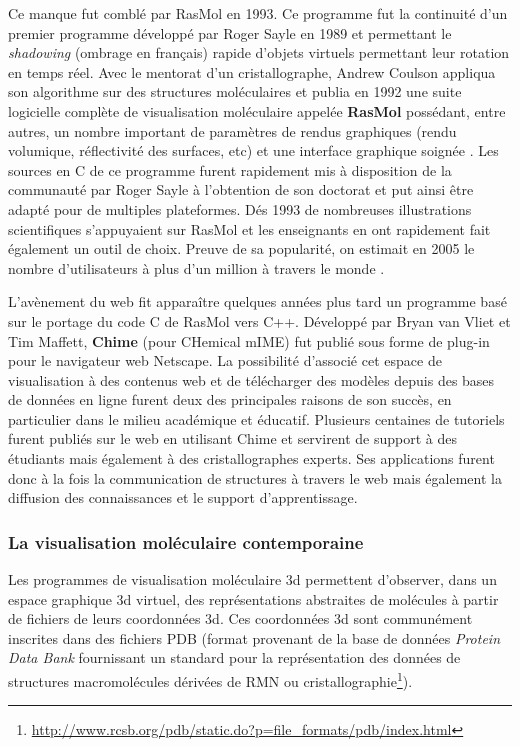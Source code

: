 Ce manque fut comblé par RasMol en 1993. Ce programme fut la continuité d'un premier programme développé par Roger Sayle en 1989 et permettant le \textit{shadowing} (ombrage en français) rapide d'objets virtuels permettant leur rotation en temps réel. 
Avec le mentorat d'un cristallographe, Andrew Coulson appliqua son algorithme sur des structures moléculaires et publia en 1992 une suite logicielle complète de visualisation moléculaire appelée \textbf{RasMol} possédant, entre autres, un nombre important de paramètres de rendus graphiques (rendu volumique, réflectivité des surfaces, etc) et une interface graphique soignée \cite{sayle1992rasmol}. Les sources en C de ce programme furent rapidement mis à disposition de la communauté par Roger Sayle à l'obtention de son doctorat et put ainsi être adapté pour de multiples plateformes. Dés 1993 de nombreuses illustrations scientifiques s'appuyaient sur RasMol et les enseignants en ont rapidement fait également un outil de choix. Preuve de sa popularité, on estimait en 2005 le nombre d'utilisateurs à plus d'un million à travers le monde \cite{martz2004history}.

L'avènement du web fit apparaître quelques années plus tard un programme basé sur le portage du code C de RasMol vers C++. Développé par Bryan van Vliet et Tim Maffett, \textbf{Chime} (pour CHemical mIME) fut publié sous forme de plug-in pour le navigateur web Netscape. La possibilité d'associé cet espace de visualisation à des contenus web et de télécharger des modèles depuis des bases de données en ligne furent deux des principales raisons de son succès, en particulier dans le milieu académique et éducatif. Plusieurs centaines de tutoriels furent publiés sur le web en utilisant Chime et servirent de support à des étudiants mais également à des cristallographes experts. Ses applications furent donc à la fois la communication de structures à travers le web mais également la diffusion des connaissances et le support d'apprentissage.


\subsubsection{La visualisation moléculaire contemporaine}

Les programmes de visualisation moléculaire 3d permettent d'observer, dans un espace graphique 3d virtuel, des représentations abstraites de molécules à partir de fichiers de leurs coordonnées 3d. Ces coordonnées 3d sont communément inscrites dans des fichiers PDB (format provenant de la base de données \textit{Protein Data Bank} fournissant un standard pour la représentation des données de structures macromolécules dérivées de RMN ou cristallographie\footnote{\url{http://www.rcsb.org/pdb/static.do?p=file_formats/pdb/index.html}}).

